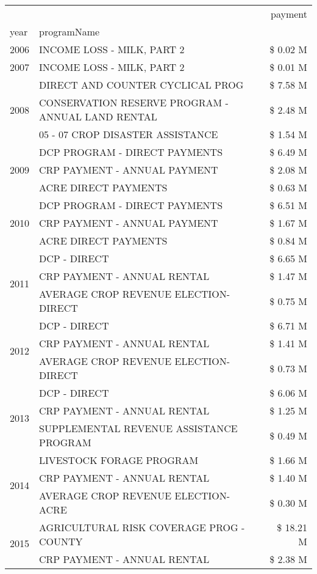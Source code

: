 \begin{tabular}{llr}
\toprule
 &  & payment \\
year & programName &  \\
\midrule
2006 & INCOME LOSS - MILK, PART 2 & \$ 0.02 M \\
\cline{1-3}
2007 & INCOME LOSS - MILK, PART 2 & \$ 0.01 M \\
\cline{1-3}
\multirow[t]{3}{*}{2008} & DIRECT AND COUNTER CYCLICAL PROG & \$ 7.58 M \\
 & CONSERVATION RESERVE PROGRAM - ANNUAL LAND RENTAL & \$ 2.48 M \\
 & 05 - 07 CROP DISASTER ASSISTANCE & \$ 1.54 M \\
\cline{1-3}
\multirow[t]{3}{*}{2009} & DCP PROGRAM - DIRECT PAYMENTS & \$ 6.49 M \\
 & CRP PAYMENT - ANNUAL PAYMENT & \$ 2.08 M \\
 & ACRE DIRECT PAYMENTS & \$ 0.63 M \\
\cline{1-3}
\multirow[t]{3}{*}{2010} & DCP PROGRAM - DIRECT PAYMENTS & \$ 6.51 M \\
 & CRP PAYMENT - ANNUAL PAYMENT & \$ 1.67 M \\
 & ACRE DIRECT PAYMENTS & \$ 0.84 M \\
\cline{1-3}
\multirow[t]{3}{*}{2011} & DCP - DIRECT & \$ 6.65 M \\
 & CRP PAYMENT - ANNUAL RENTAL & \$ 1.47 M \\
 & AVERAGE CROP REVENUE ELECTION-DIRECT & \$ 0.75 M \\
\cline{1-3}
\multirow[t]{3}{*}{2012} & DCP - DIRECT & \$ 6.71 M \\
 & CRP PAYMENT - ANNUAL RENTAL & \$ 1.41 M \\
 & AVERAGE CROP REVENUE ELECTION-DIRECT & \$ 0.73 M \\
\cline{1-3}
\multirow[t]{3}{*}{2013} & DCP - DIRECT & \$ 6.06 M \\
 & CRP PAYMENT - ANNUAL RENTAL & \$ 1.25 M \\
 & SUPPLEMENTAL REVENUE ASSISTANCE PROGRAM & \$ 0.49 M \\
\cline{1-3}
\multirow[t]{3}{*}{2014} & LIVESTOCK FORAGE PROGRAM & \$ 1.66 M \\
 & CRP PAYMENT - ANNUAL RENTAL & \$ 1.40 M \\
 & AVERAGE CROP REVENUE ELECTION-ACRE & \$ 0.30 M \\
\cline{1-3}
\multirow[t]{3}{*}{2015} & AGRICULTURAL RISK COVERAGE PROG - COUNTY & \$ 18.21 M \\
 & CRP PAYMENT - ANNUAL RENTAL & \$ 2.38 M \\

\end{tabular}
